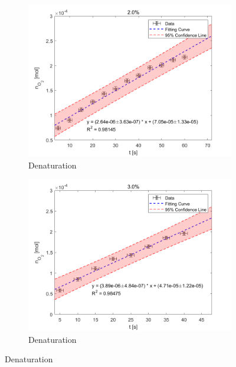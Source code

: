 \documentclass[%
 reprint,
 amsmath,amssymb,
 aps,
]{revtex4-2}
\begin{document}
\begin{figure}[htbp]
	\begin{subfigure}{0.4\textwidth}
		\includegraphics[width = 1\linewidth]{MOL_20.png}%
		\caption{\label{fig:MOL_20}Denaturation}
	\end{subfigure}
	\begin{subfigure}{0.4\textwidth}
		\includegraphics[width = 1\linewidth]{MOL_30.png}%
		\caption{\label{fig:MOL_30}Denaturation}
	\end{subfigure}


\end{figure}
\end{document}
